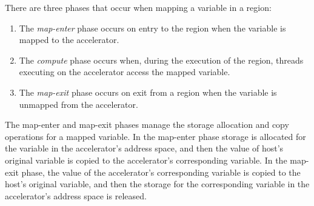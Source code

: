 There are three phases that occur when mapping a variable in a 
region: \begin{enumerate}
    \item The \emph{map-enter} phase occurs on entry to the 
    region when the variable is mapped to the accelerator.  
    \item The \emph{compute} phase occurs when, during the execution of the
     region, threads executing on the accelerator access the
    mapped variable.
    \item The \emph{map-exit} phase occurs on exit from a  region
    when the variable is unmapped from the accelerator.  
\end{enumerate}

The map-enter and map-exit phases manage the storage allocation and copy
operations for a mapped variable.
In the map-enter phase storage is allocated for the variable in the accelerator's
address space, and then the value of host's original variable is copied to the 
accelerator's corresponding variable.
In the map-exit phase, the value of the accelerator's corresponding variable 
is copied to the host's original variable, and then the storage for the 
corresponding variable in the accelerator's address space is released.
    
%
%
%

